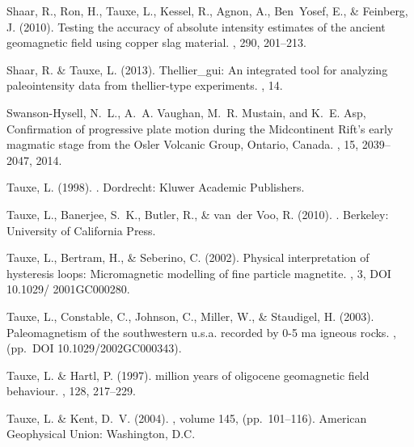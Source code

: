 \documentclass[11pt]{book}
\begin{document}
{{{{{{\begin{thebibliography}{}
Shaar, R., Ron, H., Tauxe, L., Kessel, R., Agnon, A., Ben~Yosef, E., \&
  Feinberg, J. (2010).
\newblock Testing the accuracy of absolute intensity estimates of the ancient
  geomagnetic field using copper slag material.
, 290, 201--213.

Shaar, R. \& Tauxe, L. (2013).
\newblock Thellier\_gui: An integrated tool for analyzing paleointensity data
  from thellier-type experiments.
, 14.

Swanson-Hysell, N.~L., A.~A. Vaughan, M.~R. Mustain, and K.~E. Asp,
\newblock Confirmation of progressive plate motion during the Midcontinent Rift's early
  magmatic stage from the Osler Volcanic Group, Ontario, Canada.
  , 15, 2039--2047, 2014.

Tauxe, L. (1998).
.
\newblock Dordrecht: Kluwer Academic Publishers.

Tauxe, L., Banerjee, S.~K., Butler, R., \& van~der Voo, R. (2010).
.
\newblock Berkeley: University of California Press.

Tauxe, L., Bertram, H., \& Seberino, C. (2002).
\newblock Physical interpretation of hysteresis loops: Micromagnetic modelling
  of fine particle magnetite.
, 3, DOI 10.1029/ 2001GC000280.

Tauxe, L., Constable, C., Johnson, C., Miller, W., \& Staudigel, H. (2003).
\newblock Paleomagnetism of the southwestern u.s.a. recorded by 0-5 ma igneous
  rocks.
, (pp.\ DOI 10.1029/2002GC000343).

Tauxe, L. \& Hartl, P. (1997).
 million years of oligocene geomagnetic field behaviour.
, 128, 217--229.

Tauxe, L. \& Kent, D.~V. (2004).
, volume 145, (pp.\ 101--116).
\newblock American Geophysical Union: Washington, D.C.


\end{thebibliography}}}}}}}
\end{document}
